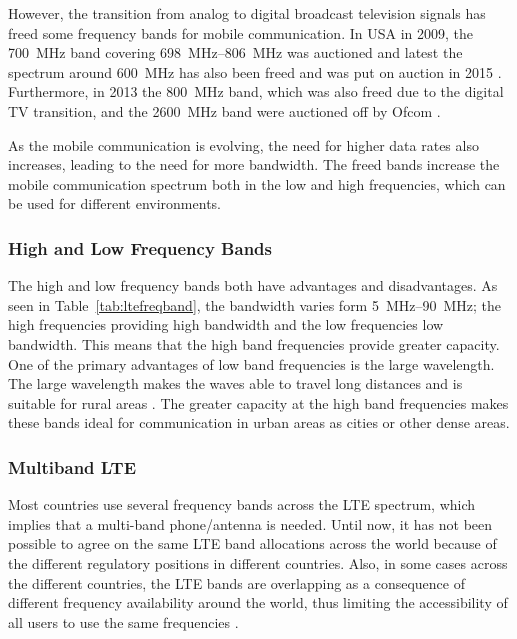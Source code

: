 However, the transition from analog to digital broadcast television signals has freed some frequency bands for mobile communication. In USA in 2009, the \SI{700}{MHz} band covering \SIrange{698}{806}{MHz} \cite{fcc2007auction} was auctioned and latest the spectrum around \SI{600}{MHz} has also been freed and was put on auction in 2015 \cite{Samantha2015tunableAntennas}. Furthermore, in 2013 the \SI{800}{MHz} band, which was also freed due to the digital TV transition, and the \SI{2600}{MHz} band were auctioned off by Ofcom \cite{james2014lte}.   

As the mobile communication is evolving, the need for higher data rates also increases, leading to the need for more bandwidth. The freed bands increase the mobile communication spectrum both in the low and high frequencies, which can be used for different environments.  

\subsubsection{High and Low Frequency Bands}
The high and low frequency bands both have advantages and disadvantages. As seen in Table~\ref{tab:ltefreqband}, the bandwidth varies form \SIrange{5}{90}{MHz}; the high frequencies providing high bandwidth and the low frequencies low bandwidth. This means that the high band frequencies provide greater capacity. One of the primary advantages of low band frequencies is the large wavelength. The large wavelength makes the waves able to travel long distances and is suitable for rural areas \cite{pozar2011microwave}. The greater capacity at the high band frequencies makes these bands ideal for communication in urban areas as cities or other dense areas.

\subsubsection{Multiband LTE}
Most countries use several frequency bands across the LTE spectrum, which implies that a multi-band phone/antenna is needed.  
Until now, it has not been possible to agree on the same LTE band allocations across the world because of the different regulatory positions in different countries. Also, in some cases across the different countries, the LTE bands are overlapping as a consequence of different frequency availability around the world, thus limiting the accessibility of all users to use the same frequencies \cite{radio2015electronics}.  

